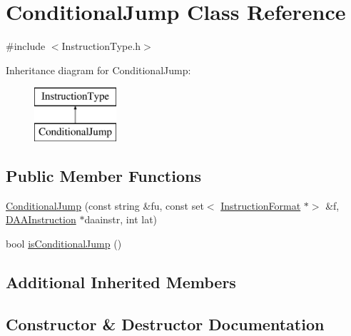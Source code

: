 \hypertarget{classConditionalJump}{}\section{Conditional\+Jump Class Reference}
\label{classConditionalJump}


{\ttfamily \#include $<$Instruction\+Type.\+h$>$}

Inheritance diagram for Conditional\+Jump\+:\begin{figure}[H]
\begin{center}
\leavevmode
\includegraphics[height=2.000000cm]{classConditionalJump}
\end{center}
\end{figure}
\subsection*{Public Member Functions}
\begin{DoxyCompactItemize}
\item 
\hyperlink{classConditionalJump_a36f43f20137f979b574e70c34a1140a9}{Conditional\+Jump} (const string \&fu, const set$<$ \hyperlink{classInstructionFormat}{Instruction\+Format} $\ast$$>$ \&f, \hyperlink{classDAAInstruction}{D\+A\+A\+Instruction} $\ast$daainstr, int lat)
\item 
bool \hyperlink{classConditionalJump_a2341c5b034b189c24b858651a51d6dba}{is\+Conditional\+Jump} ()
\end{DoxyCompactItemize}
\subsection*{Additional Inherited Members}


\subsection{Constructor \& Destructor Documentation}
\mbox{\label{classConditionalJump_a36f43f20137f979b574e70c34a1140a9}} 
